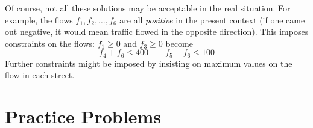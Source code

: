 \documentclass{ximera}
\begin{document}
\begin{example}
\begin{explanation}
Of course, not all these solutions may be acceptable in the real situation. For example, the flows $ f_1, f_2, \dots , f_6 $ are all \textit{positive} in the present context (if one came out negative, it would mean traffic flowed in the opposite direction). This imposes constraints on the flows: $f_1 \geq 0$ and $f_3 \geq 0$ become
\begin{equation*}
f_4 + f_6 \leq 400 \quad\quad f_5 - f_6 \leq 100
\end{equation*}
Further constraints might be imposed by insisting on maximum values on the flow in each street.
\end{explanation}
\end{example}

\section*{Practice Problems}
\end{document}

